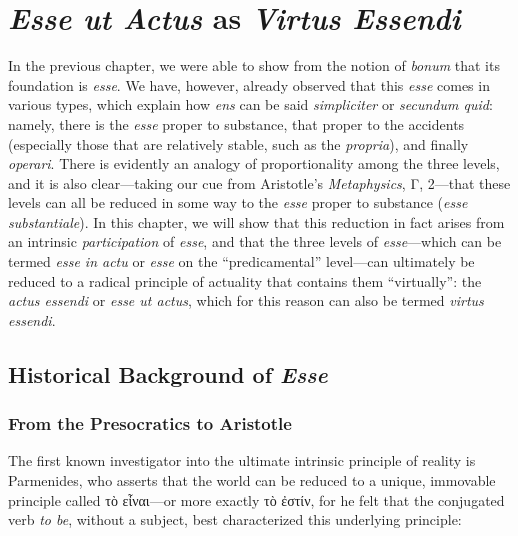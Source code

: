 
\chapter{\emph{Esse ut Actus} as \emph{Virtus Essendi}}
\label{chap:ens_resolutio}

In the previous chapter, we were able to show from the notion of \emph{bonum} that its foundation is \emph{esse}. We have, however, already observed that this \emph{esse} comes in various types, which explain how \emph{ens} can be said \emph{simpliciter} or \emph{secundum quid}: namely, there is the \emph{esse} proper to substance, that proper to the accidents (especially those that are relatively stable, such as the \emph{propria}), and finally \emph{operari}. There is evidently an analogy of proportionality among the three levels, and it is also clear—taking our cue from Aristotle’s \emph{Metaphysics}, Γ, 2—that these levels can all be reduced in some way to the \emph{esse} proper to substance (\emph{esse substantiale}). In this chapter, we will show that this reduction in fact arises from an intrinsic \emph{participation} of \emph{esse}, and that the three levels of \emph{esse}—which can be termed \emph{esse in actu} or \emph{esse} on the “predicamental” level—can ultimately be reduced to a radical principle of actuality that contains them “virtually”: the \emph{actus essendi} or \emph{esse ut actus}, which for this reason can also be termed \emph{virtus essendi}.

\section{Historical Background of \emph{Esse}}

\subsection{From the Presocratics to Aristotle}
\label{esse-presocratics-to-aristotle}

The first known investigator into the ultimate intrinsic principle of reality is Parmenides, who asserts that the world can be reduced to a unique, immovable principle called τὸ εἶναι—or more exactly τὸ ἐστίν, for he felt that the conjugated verb \emph{to be}, without a subject, best characterized this underlying principle:

